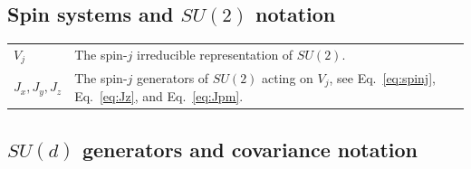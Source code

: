 \documentclass[11pt,letterpaper]{article}
\theoremstyle{plain}
\theoremstyle{plain}
\theoremstyle{plain}
\theoremstyle{plain}
\theoremstyle{plain}
\theoremstyle{plain}
\theoremstyle{plain}
\theoremstyle{definition}
\theoremstyle{plain}
\begin{document}
\subsection*{Spin systems and \(SU(2)\) notation}

\begin{tabular}{@{}ll@{}}

\parbox[t]{0.22\textwidth}{$V_j$} & \parbox[t]{0.72\textwidth}{The spin-$j$ irreducible representation of $SU(2)$.} \\[0.6em]

\parbox[t]{0.22\textwidth}{$J_x, J_y, J_z$} & \parbox[t]{0.72\textwidth}{The spin-$j$ generators of $SU(2)$ acting on $V_j$, see Eq.~\eqref{eq:spinj}, Eq.~\eqref{eq:Jz}, and Eq.~\eqref{eq:Jpm}.} \\[0.6em]

\end{tabular}


\subsection*{\(SU(d)\) generators and covariance notation}
\end{document}
